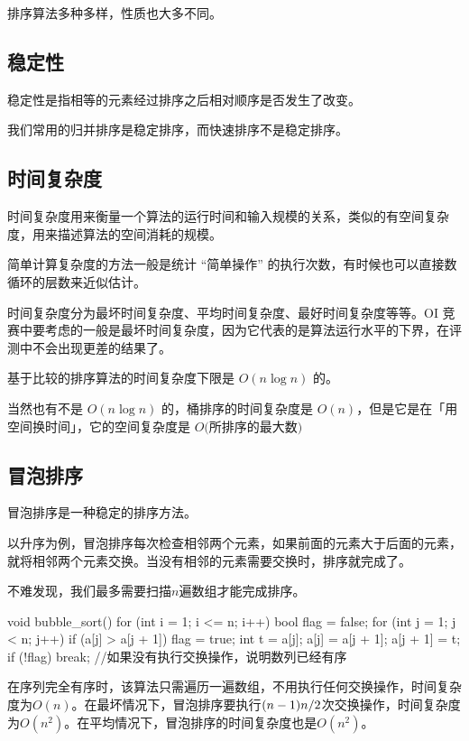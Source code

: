 
排序算法多种多样，性质也大多不同。

\subsection{稳定性}

稳定性是指相等的元素经过排序之后相对顺序是否发生了改变。

我们常用的归并排序是稳定排序，而快速排序不是稳定排序。

\subsection{时间复杂度}

时间复杂度用来衡量一个算法的运行时间和输入规模的关系，类似的有空间复杂度，用来描述算法的空间消耗的规模。

简单计算复杂度的方法一般是统计 “简单操作” 的执行次数，有时候也可以直接数循环的层数来近似估计。

时间复杂度分为最坏时间复杂度、平均时间复杂度、最好时间复杂度等等。OI 竞赛中要考虑的一般是最坏时间复杂度，因为它代表的是算法运行水平的下界，在评测中不会出现更差的结果了。

基于比较的排序算法的时间复杂度下限是 $O(n\log n)$ 的。

当然也有不是 $O(n\log n)$ 的，桶排序的时间复杂度是 $O(n)$，但是它是在「用空间换时间」，它的空间复杂度是 $O($所排序的最大数$)$

\subsection{冒泡排序}

冒泡排序是一种稳定的排序方法。

以升序为例，冒泡排序每次检查相邻两个元素，如果前面的元素大于后面的元素，就将相邻两个元素交换。当没有相邻的元素需要交换时，排序就完成了。

不难发现，我们最多需要扫描$n$遍数组才能完成排序。

\begin{cppcode}
void bubble_sort() {
  for (int i = 1; i <= n; i++) {
    bool flag = false;
    for (int j = 1; j < n; j++)
      if (a[j] > a[j + 1]) {
        flag = true;
        int t = a[j];
        a[j] = a[j + 1];
        a[j + 1] = t;
      }
    if (!flag) break;  //如果没有执行交换操作，说明数列已经有序
  }
}
\end{cppcode}

在序列完全有序时，该算法只需遍历一遍数组，不用执行任何交换操作，时间复杂度为$O(n)$。在最坏情况下，冒泡排序要执行$(n-1) \* n/2$次交换操作，时间复杂度为$O(n^2)$。在平均情况下，冒泡排序的时间复杂度也是$O(n^2)$。

